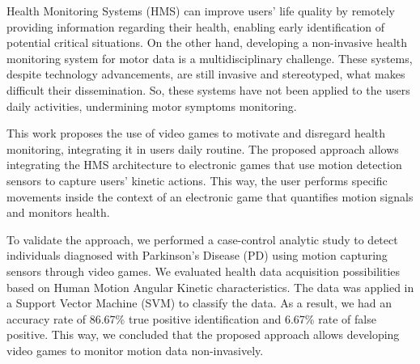 
Health Monitoring Systems (HMS) can improve users' life quality by remotely providing information regarding their health, enabling early identification of potential critical situations. On the other hand, developing a non-invasive health monitoring system for motor data is a multidisciplinary challenge. These systems, despite technology advancements, are still invasive and stereotyped, what makes difficult their dissemination. So, these systems have not been applied to the users daily activities, undermining motor symptoms monitoring.

This work proposes the use of video games
to motivate and disregard health monitoring, integrating it in users daily routine. The proposed approach allows integrating the HMS architecture to electronic games that use motion detection sensors to capture users' kinetic actions. This way, the user performs specific movements inside the context of an electronic game that quantifies motion signals and monitors health.

To validate the approach, we performed a case-control analytic study to detect individuals diagnosed with Parkinson's Disease (PD) using motion capturing sensors through video games. We evaluated health data acquisition possibilities based on Human Motion Angular Kinetic characteristics. The data was applied in a Support Vector Machine (SVM) to classify the data. As a result, we had an accuracy rate of 86.67\% true positive identification and 6.67\% rate of false positive. This way, we concluded that the proposed approach allows developing video games to monitor motion data non-invasively.